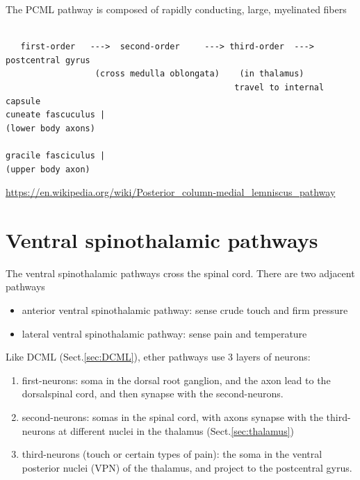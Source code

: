 The PCML pathway is composed of rapidly conducting, large, myelinated fibers
{\tiny
\begin{verbatim}
 
   first-order   --->  second-order     ---> third-order  ---> postcentral gyrus
                  (cross medulla oblongata)    (in thalamus)
                                              travel to internal capsule
cuneate fascuculus |     
(lower body axons) 

gracile fasciculus |
(upper body axon)
\end{verbatim}
}
\url{https://en.wikipedia.org/wiki/Posterior_column-medial_lemniscus_pathway}

\section{Ventral spinothalamic pathways}
\label{sec:ventral-spinothalamic-pathway}

The ventral spinothalamic pathways cross the spinal cord.
There are two adjacent pathways
\begin{itemize}
    \item anterior ventral spinothalamic pathway: sense crude touch and
firm pressure 
    \item lateral ventral spinothalamic pathway: sense pain and
  temperature 
\end{itemize}

Like DCML (Sect.\ref{sec:DCML}), ether pathways use 3 layers of neurons:
\begin{enumerate}
  \item first-neurons: soma in the dorsal root ganglion, and the axon 
  lead to the dorsalspinal cord, and then synapse with the second-neurons.
  
  \item second-neurons: somas in the spinal cord, with axons
  synapse with the third-neurons at different nuclei in the thalamus 
(Sect.\ref{sec:thalamus}) 

  
  \item third-neurons (touch or certain types of pain): the soma in
   the ventral posterior nuclei (VPN) of the thalamus, and project to
   the postcentral gyrus. 
\end{enumerate}

